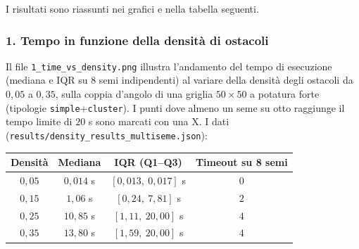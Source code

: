 \begin{table}[H]
\centering
{}
\caption{Conformità fra le tipologie di ostacolo del Compito 1 e la campagna che le copre. Per \texttt{mix} la densità è misurata a posteriori sulla griglia generata, non assunta uguale al parametro nominale.}
\label{tab:conformita_tipologie}
\end{table}

I risultati sono riassunti nei grafici e nella tabella seguenti.

\subsubsection{1. Tempo in funzione della densità di ostacoli}
\label{sssec:densita}
Il file \texttt{1\_time\_vs\_density.png} illustra l'andamento del tempo di esecuzione (mediana e IQR su $8$ semi indipendenti) al variare della densità degli ostacoli da $0{,}05$ a $0{,}35$, sulla coppia d'angolo di una griglia $50\times50$ a potatura forte (tipologie \texttt{simple}+\texttt{cluster}). I punti dove almeno un seme su otto raggiunge il tempo limite di $20$ s sono marcati con una X. I dati (\texttt{results/density\_results\_multiseme.json}):

\begin{center}
\begin{tabular}{|c|c|c|c|}
\hline
\textbf{Densità} & \textbf{Mediana} & \textbf{IQR (Q1--Q3)} & \textbf{Timeout su 8 semi} \\
\hline
$0{,}05$ & $0{,}014$ s & $[0{,}013,\ 0{,}017]$ s & $0$ \\
$0{,}15$ & $1{,}06$ s & $[0{,}24,\ 7{,}81]$ s & $2$ \\
$0{,}25$ & $10{,}85$ s & $[1{,}11,\ 20{,}00]$ s & $4$ \\
$0{,}35$ & $13{,}80$ s & $[1{,}59,\ 20{,}00]$ s & $4$ \\
\hline
\end{tabular}
\end{center}

